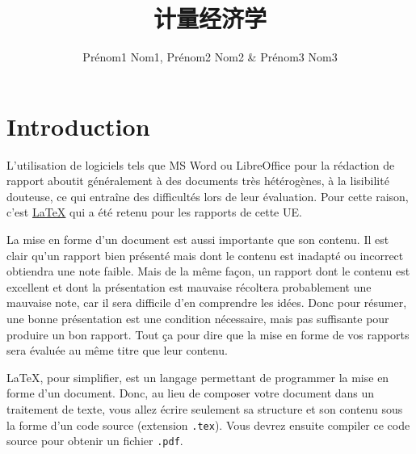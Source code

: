 \documentclass{ceri}
\title{计量经济学}
\author{
	Prénom1 Nom1, 
	Prénom2 Nom2 \&
	Prénom3 Nom3
}
\begin{document}
\maketitle

\MyToc

\sloppy          


\section{Introduction}
L'utilisation de logiciels tels que MS Word ou LibreOffice pour la rédaction de rapport aboutit généralement à des documents très hétérogènes, à la lisibilité douteuse, ce qui entraîne des difficultés lors de leur évaluation. Pour cette raison, c'est \href{http://fr.wikipedia.org/wiki/LaTeX}{\LaTeX} \cite{LaTeXProject2010, Wikipedia2011a} qui a été retenu pour les rapports de cette UE.

La mise en forme d'un document est aussi importante que son contenu. Il est clair qu'un rapport bien présenté mais dont le contenu est inadapté ou incorrect obtiendra une note faible. Mais de la même façon, un rapport dont le contenu est excellent et dont la présentation est mauvaise récoltera probablement une mauvaise note, car il sera difficile d'en comprendre les idées. Donc pour résumer, une bonne présentation est une condition nécessaire, mais pas suffisante pour produire un bon rapport. Tout ça pour dire que la mise en forme de vos rapports sera évaluée au même titre que leur contenu.
	
\LaTeX{}, pour simplifier, est un langage permettant de programmer la mise en forme d'un document. Donc, au lieu de composer votre document dans un traitement de texte, vous allez écrire seulement sa structure et son contenu sous la forme d'un code source (extension \texttt{.tex}). Vous devrez ensuite compiler ce code source pour obtenir un fichier \texttt{.pdf}.
	
\end{document}
